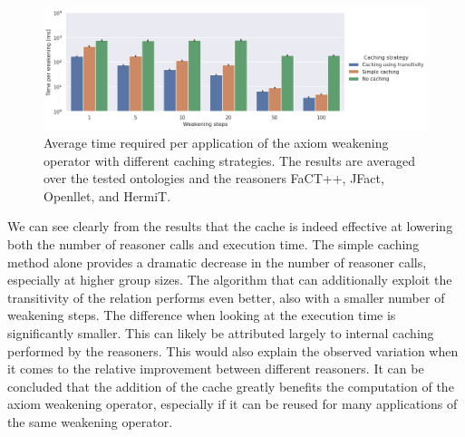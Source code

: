 \begin{figure}[ht]
  \centering
  \includegraphics[width=\textwidth]{resources/time-cache-bar.png}
  \caption{Average time required per application of the axiom weakening operator with different caching strategies. The results are averaged over the tested ontologies and the reasoners FaCT++, JFact, Openllet, and HermiT.}
  \label{fig:results-cache-time}
\end{figure}

We can see clearly from the results that the cache is indeed effective at lowering both the number of reasoner calls and execution time. The simple caching method alone provides a dramatic decrease in the number of reasoner calls, especially at higher group sizes. The algorithm that can additionally exploit the transitivity of the relation performs even better, also with a smaller number of weakening steps. The difference when looking at the execution time is significantly smaller. This can likely be attributed largely to internal caching performed by the reasoners. This would also explain the observed variation when it comes to the relative improvement between different reasoners. It can be concluded that the addition of the cache greatly benefits the computation of the axiom weakening operator, especially if it can be reused for many applications of the same weakening operator.

